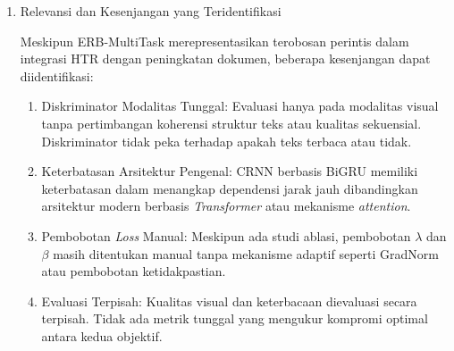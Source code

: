 \begin{enumerate}[leftmargin=*, labelindent=0pt, itemsep=1ex, topsep=0pt]
\begin{enumerate}[leftmargin=1.5em, labelsep=0.5em, itemindent=0pt, label=\alph*., topsep=0pt, parsep=0pt, itemsep=0pt]
      \item Integrasi Perintis: Penelitian pertama yang mengintegrasikan pengenal HTR (CRNN) dalam siklus pelatihan GAN untuk peningkatan dokumen tulisan tangan
      \item Evaluasi \textit{Dual-Objective}: Mengadopsi protokol evaluasi simultan untuk kualitas visual (PSNR, FM) dan keterbacaan fungsional (CER, WER)
      \item \textit{Progressive Learning}: Membuktikan bahwa melatih pengenal secara progresif dari domain terdegradasi ke domain bersih lebih efektif
      \item Validasi Multi-Aksara: Demonstrasi efektivitas pada aksara Arab (KHATT) dan Latin (IAM)
      \item \textit{State-of-the-Art} DIBCO: Mencapai SOTA pada H-DIBCO 2016, H-DIBCO 2017, dan H-DIBCO 2018 (setelah \textit{fine-tuning})
\end{enumerate}


\item Relevansi dan Kesenjangan yang Teridentifikasi

Meskipun ERB-MultiTask merepresentasikan terobosan perintis dalam integrasi HTR dengan peningkatan dokumen, beberapa kesenjangan dapat diidentifikasi:

\begin{enumerate}[leftmargin=1.5em, labelsep=0.5em, itemindent=0pt, label=\alph*., topsep=0pt, parsep=0pt, itemsep=0pt]
      \item Diskriminator Modalitas Tunggal: Evaluasi hanya pada modalitas visual tanpa pertimbangan koherensi struktur teks atau kualitas sekuensial. Diskriminator tidak peka terhadap apakah teks terbaca atau tidak.

      \item Keterbatasan Arsitektur Pengenal: CRNN berbasis BiGRU memiliki keterbatasan dalam menangkap dependensi jarak jauh dibandingkan arsitektur modern berbasis \textit{Transformer} atau mekanisme \textit{attention}.

      \item Pembobotan \textit{Loss} Manual: Meskipun ada studi ablasi, pembobotan $\lambda$ dan $\beta$ masih ditentukan manual tanpa mekanisme adaptif seperti GradNorm atau pembobotan ketidakpastian.

      \item Evaluasi Terpisah: Kualitas visual dan keterbacaan dievaluasi secara terpisah. Tidak ada metrik tunggal yang mengukur kompromi optimal antara kedua objektif.
\end{enumerate}

\end{enumerate}

